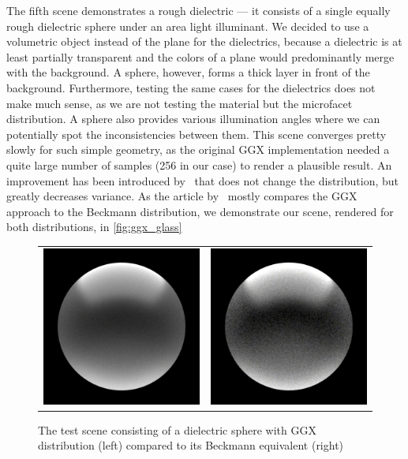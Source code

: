 The fifth scene demonstrates a rough dielectric --- it consists of a single equally rough dielectric sphere under an area light illuminant. We decided to use a volumetric object instead of the plane for the dielectrics, because a dielectric is at least partially transparent and the colors of a plane would predominantly merge with the background. A sphere, however, forms a thick layer in front of the background. Furthermore, testing the same cases for the dielectrics does not make much sense, as we are not testing the material but the microfacet distribution. A sphere also provides various illumination angles where we can potentially spot the inconsistencies between them. This scene converges pretty slowly for such simple geometry, as the original GGX implementation needed a quite large number of samples (256 in our case) to render a plausible result. An improvement has been introduced by~\citet{heitz2018sampling} that does not change the distribution, but greatly decreases variance. As the article by~\citet{walter2007microfacet} mostly compares the GGX approach to the Beckmann distribution, we demonstrate our scene, rendered for both distributions, in \autoref{fig:ggx_glass}

\begin{figure}[h]
	\begin{tabular}{cc}
		\includegraphics[width=.45\linewidth]{img/ggx_glass.png}
		&
		\includegraphics[width=.45\linewidth]{img/beckmann_glass.png}
	\end{tabular}
	\caption{The test scene consisting of a dielectric sphere with GGX distribution (left) compared to its Beckmann equivalent (right)}
	\label{fig:ggx_glass}
\end{figure}

